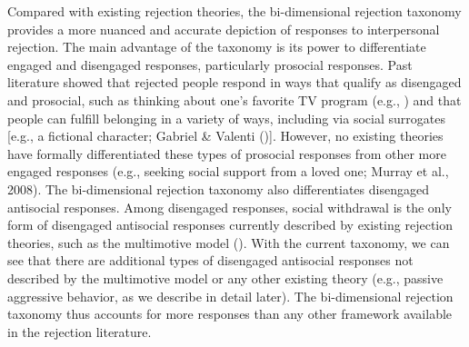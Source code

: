 \documentclass[
]{udthesis}
\begin{document}
Compared with existing rejection theories, the bi-dimensional rejection
taxonomy provides a more nuanced and accurate depiction of responses to
interpersonal rejection. The main advantage of the taxonomy is its power
to differentiate engaged and disengaged responses, particularly
prosocial responses. Past literature showed that rejected people respond
in ways that qualify as disengaged and prosocial, such as thinking about
one's favorite TV program (e.g., ) and
that people can fulfill belonging in a variety of ways, including via
social surrogates {[}e.g., a fictional character; Gabriel \& Valenti (){]}. However, no existing theories have formally differentiated these
types of prosocial responses from other more engaged responses (e.g.,
seeking social support from a loved one; Murray et al., 2008). The
bi-dimensional rejection taxonomy also differentiates disengaged
antisocial responses. Among disengaged responses, social withdrawal is
the only form of disengaged antisocial responses currently described by
existing rejection theories, such as the multimotive model
(). With the current
taxonomy, we can see that there are additional types of disengaged
antisocial responses not described by the multimotive model or any other
existing theory (e.g., passive aggressive behavior, as we describe in
detail later). The bi-dimensional rejection taxonomy thus accounts for
more responses than any other framework available in the rejection
literature.
\end{document}
